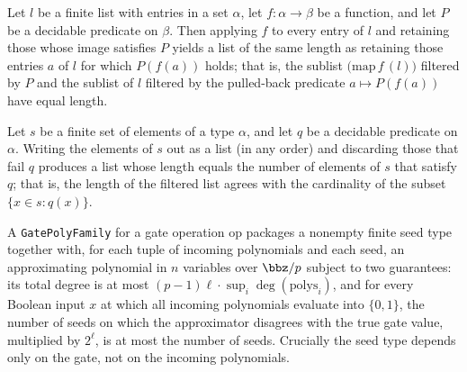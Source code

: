 \begin{lemma}
\label{RazborovSmolensky.list_filter_map_length}
\leanok
{}
Let $l$ be a finite list with entries in a set $\alpha$, let $f\colon \alpha \to \beta$
be a function, and let $P$ be a decidable predicate on $\beta$. Then applying $f$ to
every entry of $l$ and retaining those whose image satisfies $P$ yields a list of the
same length as retaining those entries $a$ of $l$ for which $P(f(a))$ holds; that is,
the sublist $\bigl(\mathrm{map}\,f\,(l)\bigr)$ filtered by $P$ and the sublist of $l$
filtered by the pulled-back predicate $a \mapsto P(f(a))$ have equal length.
\end{lemma}

\begin{lemma}
\label{RazborovSmolensky.finset_toList_filter_length_eq_card}
\leanok
{}
Let $s$ be a finite set of elements of a type $\alpha$, and let $q$ be a decidable
predicate on $\alpha$. Writing the elements of $s$ out as a list (in any order) and
discarding those that fail $q$ produces a list whose length equals the number of
elements of $s$ that satisfy $q$; that is, the length of the filtered list agrees with
the cardinality of the subset $\{x \in s : q(x)\}$.
\end{lemma}

\begin{definition}
\label{BoolCircuit.GatePolyFamily}
\leanok
{}
A \texttt{GatePolyFamily} for a gate operation $\mathrm{op}$ packages a nonempty finite seed type
together with, for each tuple of incoming polynomials and each seed, an approximating polynomial in
$n$ variables over $\bbz/p$ subject to two guarantees: its total degree is at most
$(p-1)\ell \cdot \sup_i \deg(\text{polys}_i)$, and for every Boolean input $x$ at which all incoming
polynomials evaluate into $\{0,1\}$, the number of seeds on which the approximator disagrees with
the true gate value, multiplied by $2^{\ell}$, is at most the number of seeds.  Crucially the seed
type depends only on the gate, not on the incoming polynomials.
\end{definition}

